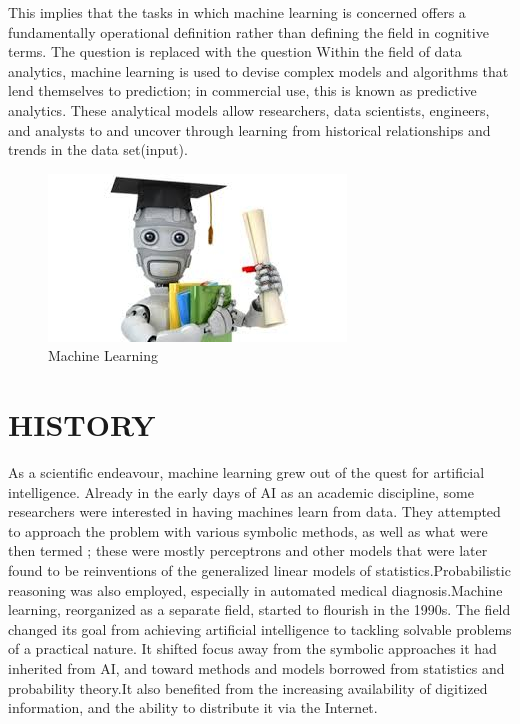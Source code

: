 \documentclass[12pt]{article}
\begin{document}
{This implies that the tasks in which machine learning is concerned offers a fundamentally operational definition rather than defining the field in cognitive terms. The question  is replaced with the question 
Within the field of data analytics, machine learning is used to devise complex models and algorithms that lend themselves to prediction; in commercial use, this is known as predictive analytics. These analytical models allow researchers, data scientists, engineers, and analysts to  and uncover  through learning from historical relationships and trends in the data set(input).
\begin{figure}
    \includegraphics{ml.jpeg}
    \centering
    \caption{Machine Learning}
\end{figure}
\section{HISTORY }
%
As a scientific endeavour, machine learning grew out of the quest for artificial intelligence. Already in the early days of AI as an academic discipline, some researchers were interested in having machines learn from data. They attempted to approach the problem with various symbolic methods, as well as what were then termed ; these were mostly perceptrons and other models that were later found to be reinventions of the generalized linear models of statistics.Probabilistic reasoning was also employed, especially in automated medical diagnosis.Machine learning, reorganized as a separate field, started to flourish in the 1990s. The field changed its goal from achieving artificial intelligence to tackling solvable problems of a practical nature. It shifted focus away from the symbolic approaches it had inherited from AI, and toward methods and models borrowed from statistics and probability theory.It also benefited from the increasing availability of digitized information, and the ability to distribute it via the Internet. 
    
}
\end{document}
